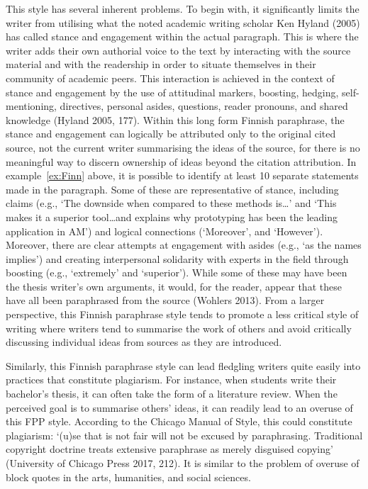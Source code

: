 \documentclass[english, 12pt, a4paper, elec, utf8, a-2b, online]{aaltothesis}
\begin{document}
\vspace{1em}
This style has several inherent problems. To begin with, it significantly limits
the writer from utilising what the noted academic writing scholar Ken Hyland 
(2005) has called stance and engagement within the actual paragraph. This is 
where the writer adds their own authorial voice to the text by interacting with 
the source material and with the readership in order to situate themselves in 
their community of academic peers. This interaction is achieved in the context 
of stance and engagement by the use of attitudinal markers, boosting, hedging, 
self-mentioning, directives, personal asides, questions, reader pronouns, and 
shared knowledge (Hyland 2005, 177). Within this long form Finnish paraphrase, 
the stance and engagement can logically be attributed only to the original cited
source, not the current writer summarising the ideas of the source, for there is
no meaningful way to discern ownership of ideas beyond the citation attribution.
In example~\ref{ex:Finn} above, it is possible to identify at least 10 separate 
statements made in the paragraph. Some of these are representative of stance, 
including claims (e.g., ‘The downside when compared to these methods is\ldots’ 
and ‘This makes it a superior tool\ldots and explains why prototyping has been 
the leading application in AM’) and logical connections (‘Moreover’, and 
‘However’). Moreover, there are clear attempts at engagement with asides (e.g., 
‘as the names implies’) and creating interpersonal solidarity with experts in 
the field through boosting (e.g., ‘extremely’ and ‘superior’). While some of 
these may have been the thesis writer’s own arguments, it would, for the reader,
appear that these have all been paraphrased from the source (Wohlers 2013). From
a larger perspective, this Finnish paraphrase style tends to promote a less 
critical style of writing where writers tend to summarise the work of others and
avoid critically discussing individual ideas from sources as they are 
introduced.

Similarly, this Finnish paraphrase style can lead fledgling writers quite easily
into practices that constitute plagiarism. For instance, when students write 
their bachelor’s thesis, it can often take the form of a literature review. When 
the perceived goal is to summarise others’ ideas, it can readily lead to an 
overuse of this FPP style. According to the Chicago Manual of Style, this could 
constitute plagiarism: ‘(u)se that is not fair will not be excused by 
paraphrasing. Traditional copyright doctrine treats extensive paraphrase as 
merely disguised copying’ (University of Chicago Press 2017, 212). It is similar
to the problem of overuse of block quotes in the arts, humanities, and social 
sciences.
\end{document}

